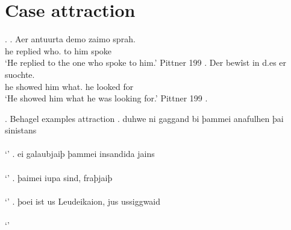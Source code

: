 
\chapter{Case attraction}


\ex.
\ag. Aer antuurta demo zaimo sprah.\\
he replied who. {to him} spoke\\
`He replied to the one who spoke to him.' Pittner 199
\bg. Der bewîst in d.es er suochte.\\
he showed him what. he {looked for}\\
`He showed him what he was looking for.' Pittner 199
\z.

\ex. Behagel examples attraction
\ag. duhwe ni gaggand bi þammei anafulhen þai sinistans\\
 \\
 `'
\bg. ei galaubjaiþ þammei insandida jains\\
 \\
 `'
\bg. þaimei iupa sind, fraþjaiþ\\
 \\
 `'
\bg. þoei ist us Leudeikaion, jus ussiggwaid\\
 \\
 `'

\phantom{x}
